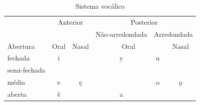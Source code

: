 
\begin{table}[!htb]
	\caption{Sistema vocálico}\label{tab:vogais}
	\begin{center}
		\begin{tabular}[c]{lccccc}
			\toprule
			                                & \multicolumn{2}{c}{Anterior} & \multicolumn{3}{c}{Posterior}                                                                  \\
			                                &                              &                               & Não-arredondada          & \multicolumn{2}{c}{Arredondada}     \\
			Abertura                        & Oral                         & Nasal                         & \multicolumn{2}{c}{Oral} & Nasal                               \\
			\midrule
			fechada                         & i                            &                               & y                        & u                               &   \\
			\rowcolor{gray!10} semi-fechada & \jeri{}                      &                               & \jeru{}                  &                                 &   \\
			média                           & e                            & ę                             &                          & o                               & ǫ \\
			\rowcolor{gray!10} aberta       & ě                            &                               & a                        &                                 &   \\
			\bottomrule
		\end{tabular}
	\end{center}
\end{table}
